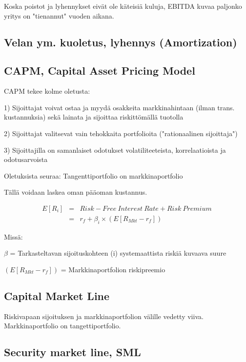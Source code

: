 \documentclass[a4paper]{article}
\begin{document}
Koska poistot ja lyhennykset eivät ole käteisiä kuluja, EBITDA kuvaa paljonko yritys on "tienannut" vuoden aikana.

\subsection{Velan ym. kuoletus, lyhennys (Amortization)}



\subsection{CAPM, Capital Asset Pricing Model}

CAPM tekee kolme oletusta:

1) Sijoittajat voivat ostaa ja myydä osakkeita markkinahintaan (ilman trans. kustannuksia) sekä lainata ja sijoittaa riskittömällä tuotolla

2) Sijoittajat valitsevat vain tehokkaita portfolioita ("rationaalinen sijoittaja")

3) Sijoittajilla on samanlaiset odotukset volatiliteeteista, korrelaatioista ja odotusarvoista

Oletuksista seuraa: Tangenttiportfolio on markkinaportfolio

Tällä voidaan laskea oman pääoman kustannus.

\[
\begin{array}{lcl}
E[R_i] & = & Risk-Free\ Interest\ Rate + Risk\ Premium \\
 & = & r_f + \beta_i \times ( E [R_{Mkt} - r_f] )
\end{array}
\]

Missä:

$\beta$ = Tarkasteltavan sijoituskohteen (i) systemaattista riskiä kuvaava suure

$( E [R_{Mkt} - r_f] )$ = Markkinaportfolion riskipreemio

\subsection{Capital Market Line}

Riskivapaan sijoituksen ja markkinaportfolion välille vedetty viiva. Markkinaportfolio on tangettiportfolio.

\subsection{Security market line, SML}
\end{document}
